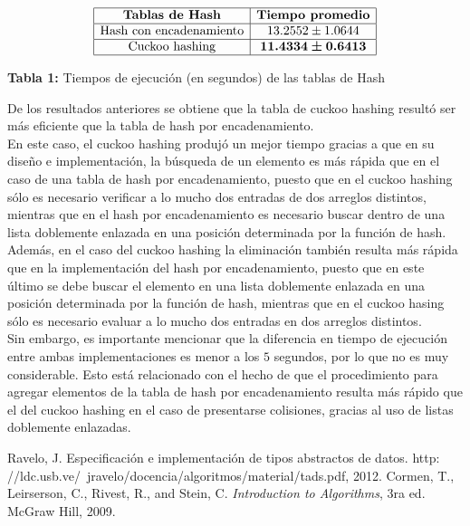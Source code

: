\documentclass[titlepage]{article}
\begin{document}
	$$\begin{array}{|c|c|}
		\hline
		\textbf{Tablas de Hash} & \textbf{Tiempo promedio}\\
		\hline
		\text{Hash con encadenamiento} & 13.2552\pm 1.0644 \\
		\hline
		\text{Cuckoo hashing} & \boldsymbol{11.4334\pm 0.6413}\\
		\hline
	\end{array}$$\:
	\begin{center}
		\textbf{Tabla 1:} Tiempos de ejecuci\'on (en segundos) de las tablas de Hash
	\end{center}\:
	
	De los resultados anteriores se obtiene que la tabla de cuckoo hashing result\'o ser m\'as eficiente que la tabla de hash por encadenamiento.\\
	
	En este caso, el cuckoo hashing produj\'o un mejor tiempo gracias a que en su diseño e implementaci\'on, la b\'usqueda de un elemento es m\'as r\'apida que en el caso de una tabla de hash por encadenamiento, puesto que en el cuckoo hashing s\'olo es necesario verificar a lo mucho dos entradas de dos arreglos distintos, mientras que en el hash por encadenamiento es necesario buscar dentro de una lista doblemente enlazada en una posici\'on determinada por la funci\'on de hash.\\
	
	Adem\'as, en el caso del cuckoo hashing la eliminaci\'on tambi\'en resulta m\'as r\'apida que en la implementaci\'on del hash por encadenamiento, puesto que en este \'ultimo se debe buscar el elemento en una lista doblemente enlazada en una posici\'on determinada por la funci\'on de hash, mientras que en el cuckoo hasing s\'olo es necesario evaluar a lo mucho dos entradas en dos arreglos distintos.\\
	
	Sin embargo, es importante mencionar que la diferencia en tiempo de ejecuci\'on entre ambas implementaciones es menor a los $5$ segundos, por lo que no es muy considerable. Esto est\'a relacionado con el hecho de que el procedimiento para agregar elementos de la tabla de hash por encadenamiento resulta m\'as r\'apido que el del cuckoo hashing en el caso de presentarse colisiones, gracias al uso de listas doblemente enlazadas.
	
	\begin{thebibliography}{}
		 Ravelo, J. Especificación e implementación de tipos abstractos de datos. http:
		//ldc.usb.ve/~jravelo/docencia/algoritmos/material/tads.pdf, 2012.
		 Cormen, T., Leirserson, C., Rivest, R., and Stein, C. \textit{Introduction to Algorithms}, 3ra ed. McGraw Hill, 2009.

	\end{thebibliography}
	
\end{document}
